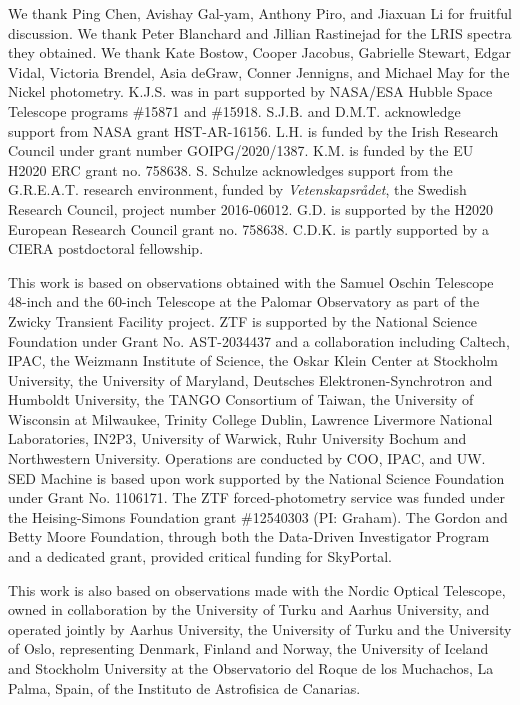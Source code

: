 \documentclass[twocolumn]{aastex631}
\begin{document}
\begin{CJK*}{UTF8}{gbsn}

We thank Ping Chen, Avishay Gal-yam, Anthony Piro, and Jiaxuan Li for fruitful discussion. We thank Peter Blanchard and Jillian Rastinejad for the LRIS spectra they obtained. We thank Kate Bostow, Cooper Jacobus, Gabrielle Stewart, Edgar Vidal, Victoria Brendel, Asia deGraw, Conner Jennigns, and Michael May for the Nickel photometry. K.J.S. was in part supported by NASA/ESA Hubble Space Telescope programs \#15871 and \#15918. S.J.B. and D.M.T. acknowledge support from NASA grant HST-AR-16156. L.H. is funded by the Irish Research Council under grant number GOIPG/2020/1387. K.M. is funded by the EU H2020 ERC grant no. 758638. S. Schulze acknowledges support from the G.R.E.A.T. research environment, funded by {\em Vetenskapsr\aa det},  the Swedish Research Council, project number 2016-06012. G.D. is supported by the H2020 European Research Council grant no. 758638. C.D.K. is partly supported by a CIERA postdoctoral fellowship.

This work is based on observations obtained with the Samuel Oschin Telescope 48-inch and the 60-inch Telescope at the Palomar Observatory as part of the Zwicky Transient Facility project. ZTF is supported by the National Science Foundation under Grant No. AST-2034437 and a collaboration including Caltech, IPAC, the Weizmann Institute of Science, the Oskar Klein Center at Stockholm University, the University of Maryland, Deutsches Elektronen-Synchrotron and Humboldt University, the TANGO Consortium of Taiwan, the University of Wisconsin at Milwaukee, Trinity College Dublin, Lawrence Livermore National Laboratories, IN2P3, University of Warwick, Ruhr University Bochum and Northwestern University. Operations are conducted by COO, IPAC, and UW.
SED Machine is based upon work supported by the National Science Foundation under Grant No. 1106171. The ZTF forced-photometry service was funded under the Heising-Simons Foundation grant \#12540303 (PI: Graham). The Gordon and Betty Moore Foundation, through both the Data-Driven Investigator Program and a dedicated grant, provided critical funding for SkyPortal.

This work is also based on observations made with the Nordic Optical Telescope, owned in collaboration by the University of Turku and Aarhus University, and operated jointly by Aarhus University, the University of Turku and the University of Oslo, representing Denmark, Finland and Norway, the University of Iceland and Stockholm University at the Observatorio del Roque de los Muchachos, La Palma, Spain, of the Instituto de Astrofisica de Canarias.


\end{CJK*}
\end{document}
